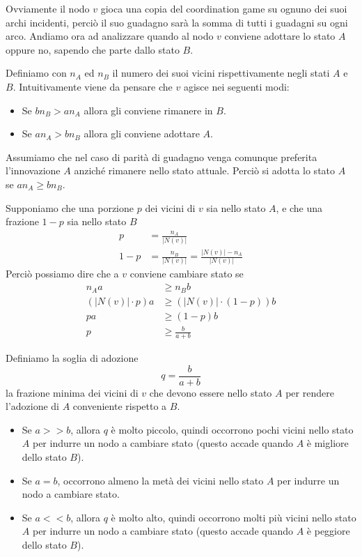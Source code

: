 Ovviamente il nodo $v$ gioca una copia del coordination game su ognuno dei suoi archi incidenti, perciò il suo guadagno sarà la somma di tutti i guadagni su ogni arco.
Andiamo ora ad analizzare quando al nodo $v$ conviene adottare lo stato $A$ oppure no, sapendo che parte dallo stato $B$.

Definiamo con $n_A$ ed $n_B$ il numero dei suoi vicini rispettivamente negli stati $A$ e $B$. Intuitivamente viene da pensare che $v$ agisce nei seguenti modi:
\begin{itemize}
    \item Se $bn_B > an_A$ allora gli conviene rimanere in $B$.
    \item Se $an_A > bn_B$ allora gli conviene adottare $A$.
\end{itemize}

Assumiamo che nel caso di parità di guadagno venga comunque preferita l'innovazione $A$ anziché rimanere nello stato attuale. Perciò si adotta lo stato $A$ se $an_A \geq bn_B$.

Supponiamo che una porzione $p$ dei vicini di $v$ sia nello stato $A$, e che una frazione $1-p$ sia nello stato $B$
\begin{align*}
    p &= \frac{n_A}{| N(v) |}\\
    1-p &= \frac{n_B}{| N(v) |} = \frac{| N(v) | - n_A}{| N(v) |}
\end{align*}
Perciò possiamo dire che a $v$ conviene cambiare stato se
\begin{align*}
    n_A a &\geq n_B b\\
    (| N(v) | \cdot p) a &\geq (| N(v) | \cdot (1-p)) b\\
    p a &\geq (1-p)b\\
    p &\geq \frac{b}{a+b}
\end{align*}

\begin{definizione}
Definiamo la soglia di adozione
\[
q = \frac{b}{a+b}
\]
la frazione minima dei vicini di $v$ che devono essere nello stato $A$ per rendere l'adozione di $A$ conveniente rispetto a $B$.
\end{definizione}

\begin{itemize}
    \item Se $a >> b$, allora $q$ è molto piccolo, quindi occorrono pochi vicini nello stato $A$ per indurre un nodo a cambiare stato (questo accade quando $A$ è migliore dello stato $B$).
    \item Se $a = b$, occorrono almeno la metà dei vicini nello stato $A$ per indurre un nodo a cambiare stato.
    \item Se $a << b$, allora $q$ è molto alto, quindi occorrono molti più vicini nello stato $A$ per indurre un nodo a cambiare stato (questo accade quando $A$ è peggiore dello stato $B$).
\end{itemize}

